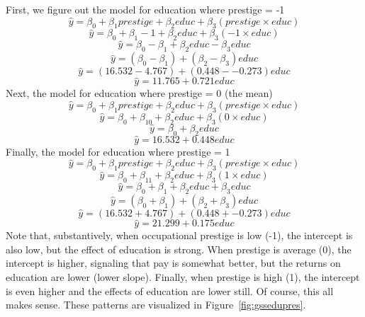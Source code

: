 First, we figure out the model for education where prestige = -1
\[
\hat{y}=\beta_0+\beta_1prestige+\beta_2educ+\beta_3\left(prestige\times educ\right)
\]
\[
\hat{y}=\beta_0+\beta_1-1+\beta_2educ+\beta_3\left(-1\times educ\right)
\]
\[
\hat{y}=\beta_0-\beta_1+\beta_2educ-\beta_3educ
\]
\[
\hat{y}=\left(\beta_0-\beta_1\right)+\left(\beta_2-\beta_3\right)educ
\]
\[
\hat{y}=\left(16.532-4.767\right)+\left(0.448--0.273\right)educ
\]
\[
\hat{y}=11.765+0.721educ
\]
Next, the model for education where prestige = 0 (the mean)
\[
\hat{y}=\beta_0+\beta_1prestige+\beta_2educ+\beta_3\left(prestige\times educ\right)
\]
\[
\hat{y}=\beta_0+\beta_10+\beta_2educ+\beta_3\left(0\times educ\right)
\]
\[
\hat{y}=\beta_0+\beta_2educ
\]
\[
\hat{y}=16.532+0.448educ
\]
Finally, the model for education where prestige = 1
\[
\hat{y}=\beta_0+\beta_1prestige+\beta_2educ+\beta_3\left(prestige\times educ\right)
\]
\[
\hat{y}=\beta_0+\beta_11+\beta_2educ+\beta_3\left(1\times educ\right)
\]
\[
\hat{y}=\beta_0+\beta_1+\beta_2educ+\beta_3educ
\]
\[
\hat{y}=\left(\beta_0+\beta_1\right)+\left(\beta_2+\beta_3\right)educ
\]
\[
\hat{y}=\left(16.532+4.767\right)+\left(0.448+-0.273\right)educ
\]
\[
\hat{y}=21.299+0.175educ
\]
Note that, substantively, when occupational prestige is low (-1), the intercept is also low, but the effect of education is strong. When prestige is average (0), the intercept is higher, signaling that pay is somewhat better, but the returns on education are lower (lower slope). Finally, when prestige is high (1), the intercept is even higher and the effects of education are lower still. Of course, this all makes sense. These patterns are visualized in Figure~\ref{fig:gssedupres}. 